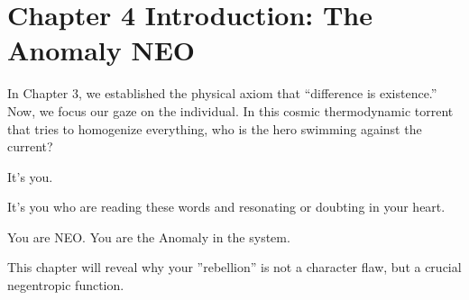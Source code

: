 \section*{Chapter 4 Introduction: The Anomaly NEO}

In Chapter 3, we established the physical axiom that ``difference is existence.'' Now, we focus our gaze on the individual. In this cosmic thermodynamic torrent that tries to homogenize everything, who is the hero swimming against the current?

It's you.

It's you who are reading these words and resonating or doubting in your heart.

You are NEO. You are the Anomaly in the system.

This chapter will reveal why your ''rebellion'' is not a character flaw, but a crucial negentropic function.

